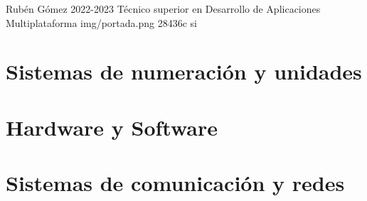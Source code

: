 \documentclass{\ClassPath/yukibook}
\begin{document}
    {Rubén Gómez}  %
    {2022-2023}    %
    {Técnico superior en \linebreak Desarrollo de  Aplicaciones Multiplataforma} %
    {}%
    {}%
    {img/portada.png} %
    {28436c}
    {si} %

    \coverpage

    \tableofcontents


    \part{Sistemas de numeración y unidades}
    \graphicspath{{../../../temas_comunes/sistemas_de_numeracion/img}}
    

    \graphicspath{{../../../temas_comunes/unidades_informacion/img}}
    

    \vfill
    \pagebreak

    \part{Hardware y Software}
    \graphicspath{{img/si/}}
    

    

    \graphicspath{{../../../temas_comunes/particionado_sistemas_ficheros_raid/img}}
    

    \graphicspath{{img/si/}}
    


    \part{Sistemas de comunicación y redes}
    \graphicspath{{../../../temas_comunes/sistemas_de_comunicacion/img}}
    

    \graphicspath{{../../../temas_comunes/introduccion_a_redes/img}}
    
\end{document}
